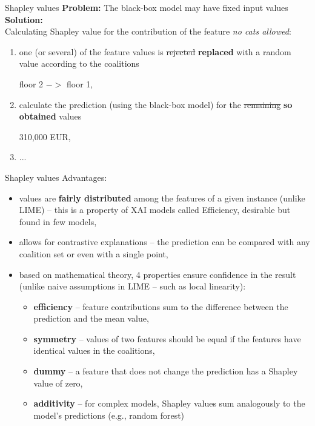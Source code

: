 \documentclass{beamer}
\begin{document}
\begin{frame}{Shapley values}
\textbf{Problem:} The black-box model may have fixed input values\\
\bigskip
\textbf{Solution:}\\
Calculating Shapley value for the contribution of the feature \textit{no cats allowed}:\\
\begin{enumerate}
\item one (or several) of the feature values is \st{rejected} \textbf{replaced} with a random value according to the coalitions \\ 
\begin{center}
floor 2 $->$ floor 1,
\end{center}
\item calculate the prediction (using the black-box model) for the \st{remaining} \textbf{so obtained} values\\
\begin{center}
310,000 EUR,
\end{center}
\item ...
\end{enumerate}
\end{frame}

\begin{frame}{Shapley values}
Advantages:
\begin{itemize}
\item values are \textbf{fairly distributed} among the features of a given instance (unlike LIME) – this is a property of XAI models called Efficiency, desirable but found in few models, 
\item allows for contrastive explanations – the prediction can be compared with any coalition set or even with a single point,
\item based on mathematical theory, 4 properties ensure confidence in the result (unlike naive assumptions in LIME – such as local linearity): 
\begin{itemize}
\item \textbf{efficiency} – feature contributions sum to the difference between the prediction and the mean value, 
\item \textbf{symmetry} – values of two features should be equal if the features have identical values in the coalitions, 
\item \textbf{dummy} – a feature that does not change the prediction has a Shapley value of zero, 
\item \textbf{additivity} – for complex models, Shapley values sum analogously to the model's predictions (e.g., random forest) 
\end{itemize}
\end{itemize}
\end{frame}
\end{document}

